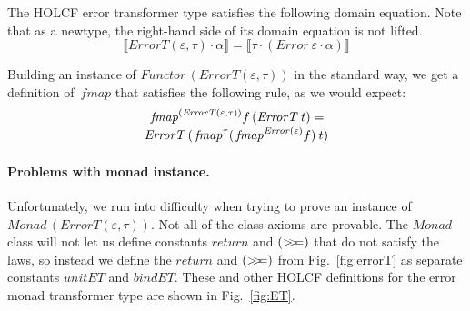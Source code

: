 \documentclass{sigplanconf}
\newcommand{\hsbind}{\mathbin{>\mkern-6mu>\mkern-6.5mu=}}
\newcommand{\REP}[1]{\ensuremath{\llbracket#1\rrbracket}}
\newcommand{\hsc}[1]{\ensuremath{\mathit{#1}}}
\newcommand{\fmap}{\,\hsc{fmap}} %
\newcommand{\tA}{\alpha}
\newcommand{\tE}{\varepsilon}
\newcommand{\tT}{\tau}
\theoremstyle{definition}
\begin{document}
The HOLCF error transformer type satisfies the following domain equation. Note that as a newtype, the right-hand side of its domain equation is not lifted.
%
\begin{equation}
\REP{\hsc{ErrorT}(\tE,\tT)\cdot\tA} = \REP{\tT\cdot(\hsc{Error}\:\tE\cdot\tA)}
\end{equation}

Building an instance of $\hsc{Functor}\,(\hsc{ErrorT}(\tE,\tT))$ in the standard way, we get a definition of $\fmap$ that satisfies the following rule, as we would expect:
%
\begin{multline}
\fmap^{(\hsc{ErrorT}(\tE,\tT))} f\,(\hsc{ErrorT}\:t) =\\[-\jot]
\hsc{ErrorT}\,(\fmap^\tT (\fmap^{\hsc{Error}(\tE)} f)\:t)
\end{multline}

\paragraph{Problems with monad instance.}

Unfortunately, we run into difficulty when trying to prove an instance of $\hsc{Monad}\,(\hsc{ErrorT}(\tE,\tT))$. Not all of the class axioms are provable. The \hsc{Monad} class will not let us define constants \hsc{return} and $(\hsbind)$ that do not satisfy the laws, so instead we define the \hsc{return} and $(\hsbind)$ from Fig.~\ref{fig:errorT} as separate constants \hsc{unitET} and \hsc{bindET}. These and other HOLCF definitions for the error monad transformer type are shown in Fig.~\ref{fig:ET}.
\end{document}
